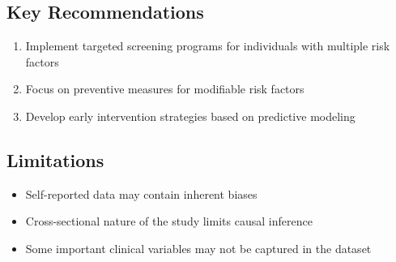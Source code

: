\documentclass[conference]{IEEEtran}
\begin{document}
\subsection{Key Recommendations}
\begin{enumerate}
    \item Implement targeted screening programs for individuals with multiple risk factors
    \item Focus on preventive measures for modifiable risk factors
    \item Develop early intervention strategies based on predictive modeling
\end{enumerate}

\subsection{Limitations}
\begin{itemize}
    \item Self-reported data may contain inherent biases
    \item Cross-sectional nature of the study limits causal inference
    \item Some important clinical variables may not be captured in the dataset
\end{itemize}
\end{document}
